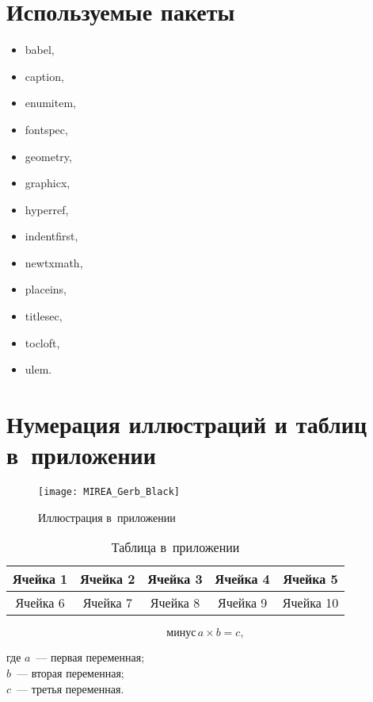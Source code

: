\documentclass{mirea-prog-lang}
\begin{document}
\appendix

\section{Используемые пакеты}
\label{appendix:used_packages}

\begin{itemize}
	\item babel,
	\item caption,
	\item enumitem,
	\item fontspec,
	\item geometry,
	\item graphicx,
	\item hyperref,
	\item indentfirst,
	\item newtxmath,
	\item placeins,
	\item titlesec,
	\item tocloft,
	\item ulem.
\end{itemize}

\section{Нумерация иллюстраций и таблиц в~приложении}
\label{appendix:fig_tab_eq_numeration}

\begin{figure}[htb]
	\centering
	\texttt{[image: MIREA\_Gerb\_Black]}
	\parskip=6pt
	\caption{Иллюстрация в~приложении}
	\label{fig:in_appendix}
\end{figure}

\begin{table}[htb]
	\caption{Таблица в~приложении}
	\centering
	\begin{tabular}{ |c|c|c|c|c| } 
		\hline
		Ячейка 1 & Ячейка 2 & Ячейка 3 & Ячейка 4 & Ячейка 5 \\ \hline
		Ячейка 6 & Ячейка 7 & Ячейка 8 & Ячейка 9 & Ячейка 10 \\ \hline
	\end{tabular}
	\label{tab:in_appendix}
\end{table}

\begin{equation}\label{eq:in_appendix}
	\text{минус}\,a\times b=c ,
\end{equation}

где $a$~--- первая переменная; \\
$b$~--- вторая переменная; \\
$c$~--- третья переменная.
\end{document}
